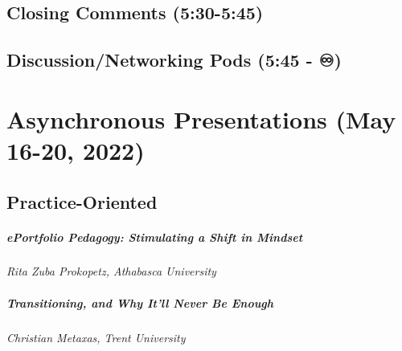 \documentclass[
]{book}
\begin{document}
\hypertarget{closing-comments-530-545}{%
\section*{Closing Comments (5:30-5:45)}\label{closing-comments-530-545}}

\hypertarget{discussionnetworking-pods-545--}{%
\section*{Discussion/Networking Pods (5:45 - ♾️)}\label{discussionnetworking-pods-545--}}

\hypertarget{asynchronous-presentations-may-16-20-2022}{%
\chapter*{Asynchronous Presentations (May 16-20, 2022)}\label{asynchronous-presentations-may-16-20-2022}}

\hypertarget{practice-oriented}{%
\section*{Practice-Oriented}\label{practice-oriented}}

\begin{secondary}
\hypertarget{eportfolio-pedagogy-stimulating-a-shift-in-mindset}{%
\paragraph{ePortfolio Pedagogy: Stimulating a Shift in
Mindset}\label{eportfolio-pedagogy-stimulating-a-shift-in-mindset}}

\emph{Rita Zuba Prokopetz, Athabasca University}
\end{secondary}

\begin{secondary}
\hypertarget{transitioning-and-why-itll-never-be-enough}{%
\paragraph{Transitioning, and Why It'll Never Be
Enough}\label{transitioning-and-why-itll-never-be-enough}}

\emph{Christian Metaxas, Trent University}
\end{secondary}
\end{document}
